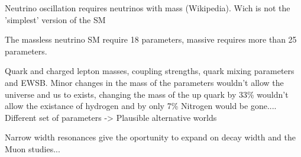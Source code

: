 Neutrino oscillation requires neutrinos with mass (Wikipedia). Wich is not the 'simplest'
version of the SM

The massless neutrino SM require 18 parameters, massive requires more than 25 parameters.

Quark and charged lepton masses, coupling strengths, quark mixing parameters and EWSB.
Minor changes in the mass of the parameters wouldn't allow the universe and us to
exists, changing the mass of the up quark by 33\% wouldn't allow the existance of
hydrogen and by only 7\% Nitrogen would be gone.... Different set of parameters
-> Plausible alternative worlds

Narrow width resonances give the oportunity to expand on decay width and the Muon studies...

